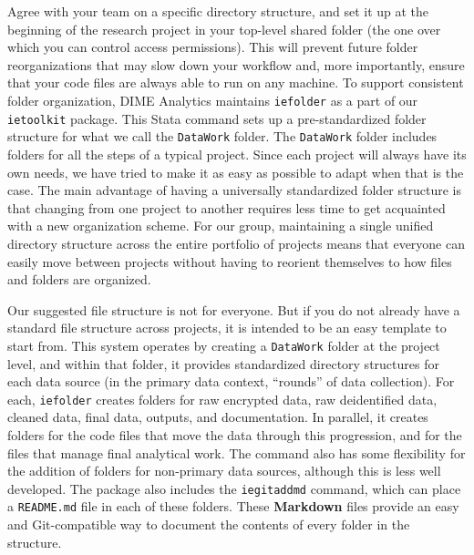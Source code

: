 Agree with your team on a specific directory structure,
and set it up at the beginning of the research project
in your top-level shared folder (the one over which you can control access permissions).
This will prevent future folder reorganizations that may slow down your workflow and,
more importantly, ensure that your code files are always able to run on any machine.
To support consistent folder organization, DIME Analytics maintains \texttt{iefolder}
as a part of our \texttt{ietoolkit} package.
This Stata command sets up a pre-standardized folder structure
for what we call the \texttt{DataWork} folder.
The \texttt{DataWork} folder includes folders for all the steps of a typical project.
Since each project will always have its own needs,
we have tried to make it as easy as possible to adapt when that is the case.
The main advantage of having a universally standardized folder structure
is that changing from one project to another requires less
time to get acquainted with a new organization scheme.
For our group, maintaining a single unified directory structure
across the entire portfolio of projects means that everyone
can easily move between projects without having to reorient
themselves to how files and folders are organized.

Our suggested file structure is not for everyone.
But if you do not already have a standard file structure across projects,
it is intended to be an easy template to start from.
This system operates by creating a \texttt{DataWork} folder at the project level,
and within that folder, it provides standardized directory structures
for each data source (in the primary data context, ``rounds'' of data collection).
For each, \texttt{iefolder} creates folders for raw encrypted data,
raw deidentified data, cleaned data, final data, outputs, and documentation.
In parallel, it creates folders for the code files
that move the data through this progression,
and for the files that manage final analytical work.
The command also has some flexibility for the addition of
folders for non-primary data sources, although this is less well developed.
The package also includes the \texttt{iegitaddmd} command,
which can place a \texttt{README.md} file in each of these folders.
These \textbf{Markdown} files provide an easy and Git-compatible way
to document the contents of every folder in the structure.

